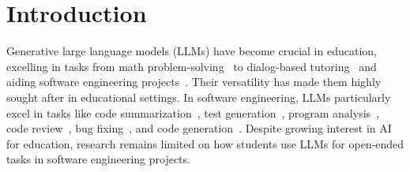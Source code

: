 \section{Introduction}

Generative large language models (LLMs) have become crucial in education, excelling in tasks from math problem-solving~\cite{Enkelejda2023} to dialog-based tutoring~\cite{Park2024} and aiding software engineering projects~\cite{Rasnayaka2024}. Their versatility has made them highly sought after in educational settings. In software engineering, LLMs particularly excel in tasks like code summarization~\cite{Ahmed2023}, test generation~\cite{Chen2024}, program analysis~\cite{Zhang2024}, code review~\cite{Lu2023}, bug fixing~\cite{Jin2023}, and code generation~\cite{Bairi2024}. Despite growing interest in AI for education, research remains limited on how students use LLMs for open-ended tasks in software engineering projects.


